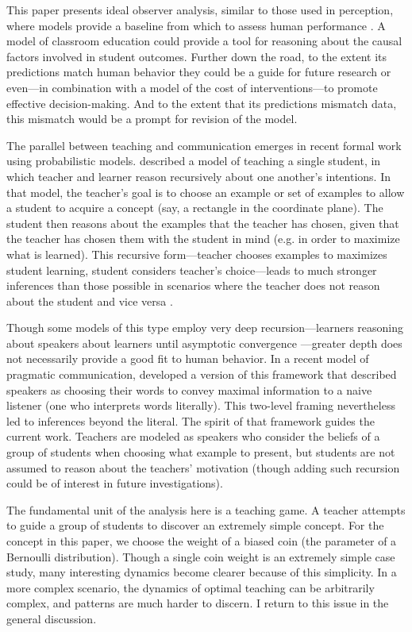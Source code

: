\documentclass[10pt,letterpaper]{article}
\begin{document}
This paper presents ideal observer analysis, similar to those used in perception, where models provide a baseline from which to assess human performance \cite{geisler2003,frank2013}. A model of classroom education could provide a tool for reasoning about the causal factors involved in student outcomes. Further down the road, to the extent its predictions match human behavior they could be a guide for future research or even---in combination with a model of the cost of interventions---to promote effective decision-making. And to the extent that its predictions mismatch data, this mismatch would be a prompt for revision of the model.

The parallel between teaching and communication emerges in recent formal work using probabilistic models.  described a model of teaching a single student, in which teacher and learner reason recursively about one another's intentions. In that model, the teacher's goal is to choose an example or set of examples to allow a student to acquire a concept (say, a rectangle in the coordinate plane). The student then reasons about the examples that the teacher has chosen, given that the teacher has chosen them with the student in mind (e.g. in order to maximize what is learned). This recursive form---teacher chooses examples to maximizes student learning, student considers teacher's choice---leads to much stronger inferences than those possible in scenarios where the teacher does not reason about the student and vice versa \cite{shafto2012}.

Though some models of this type employ very deep recursion---learners reasoning about speakers about learners until asymptotic convergence \cite{jager2010}---greater depth does not necessarily provide a good fit to human behavior. In a recent model of pragmatic communication,  developed a version of this framework that described speakers as choosing their words to convey maximal information to a naive listener (one who interprets words literally). This two-level framing nevertheless led to inferences beyond the literal. The spirit of that framework guides the current work. Teachers are modeled as speakers who consider the beliefs of a group of students when choosing what example to present, but students are not assumed to reason about the teachers' motivation (though adding such recursion could be of interest in future investigations). 

The fundamental unit of the analysis here is a teaching game. A teacher attempts to guide a group of students to discover an extremely simple concept. For the concept in this paper, we choose the weight of a biased coin (the parameter of a Bernoulli distribution). Though a single coin weight is an extremely simple case study, many interesting dynamics become clearer because of this simplicity. In a more complex scenario, the dynamics of optimal teaching can be arbitrarily complex, and patterns are much harder to discern. I return to this issue in the general discussion.
\end{document}
